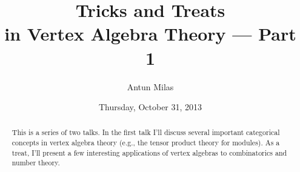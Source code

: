 \documentclass{UAmathtalk}
\author{Antun Milas}
\title{Tricks and Treats\\ in Vertex Algebra Theory --- Part 1}
\date{Thursday, October 31, 2013}
\begin{document}
\maketitle

\begin{abstract}
This is a series of two talks.
In the first talk I'll discuss several important categorical concepts in vertex algebra theory (e.g., the tensor product theory for modules).
As a treat, I'll present a few interesting applications of vertex algebras to combinatorics and number theory. 
\end{abstract}
\end{document}
